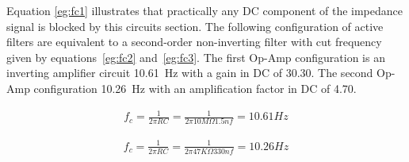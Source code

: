 Equation \ref{eg:fc1} illustrates that practically any DC component of the impedance signal is blocked by this circuits section. The following configuration of active filters are equivalent to a second-order non-inverting filter with cut frequency given by equations~\ref{eg:fc2} and~\ref{eg:fc3}. The first Op-Amp configuration is an inverting amplifier circuit \SI{10.61}{\hertz} with a gain in DC of \num{30.30}. The second Op-Amp configuration \SI{10.26}{\hertz} with an amplification factor in DC of \num{4.70}. 


\begin{align}
\label{eg:fc2}
f_c = \frac{1}{2 \pi R C} = \frac{1}{2 \pi 10M\Omega 1.5 nf}=10.61Hz
\end{align}

\begin{align}
\label{eg:fc3}
f_c = \frac{1}{2 \pi R C} = \frac{1}{2 \pi 47K\Omega 330nf}=10.26Hz
\end{align}



